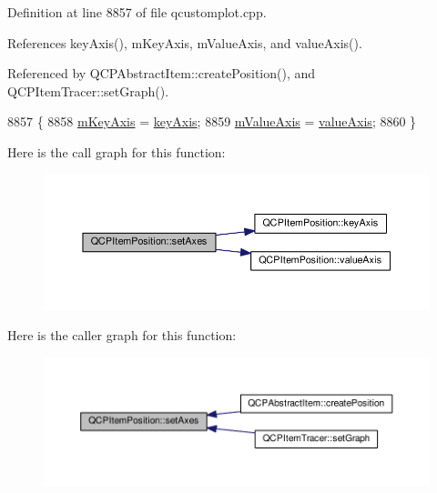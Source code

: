 Definition at line 8857 of file qcustomplot.\+cpp.



References key\+Axis(), m\+Key\+Axis, m\+Value\+Axis, and value\+Axis().



Referenced by Q\+C\+P\+Abstract\+Item\+::create\+Position(), and Q\+C\+P\+Item\+Tracer\+::set\+Graph().


\begin{DoxyCode}
8857                                                                   \{
8858   \hyperlink{class_q_c_p_item_position_a63967a33933231e92f68c8ce06bfc37e}{mKeyAxis} = \hyperlink{class_q_c_p_item_position_ab99de7ae5766d246defb2de9f47eaf51}{keyAxis};
8859   \hyperlink{class_q_c_p_item_position_a505dc2da24ba274452c1c817fcaba011}{mValueAxis} = \hyperlink{class_q_c_p_item_position_a8d3a039fb2e69df86b4015daa30dfd2d}{valueAxis};
8860 \}
\end{DoxyCode}


Here is the call graph for this function\+:\nopagebreak
\begin{figure}[H]
\begin{center}
\leavevmode
\includegraphics[width=350pt]{class_q_c_p_item_position_a2185f45c75ac8cb9be89daeaaad50e37_cgraph}
\end{center}
\end{figure}




Here is the caller graph for this function\+:\nopagebreak
\begin{figure}[H]
\begin{center}
\leavevmode
\includegraphics[width=350pt]{class_q_c_p_item_position_a2185f45c75ac8cb9be89daeaaad50e37_icgraph}
\end{center}
\end{figure}


